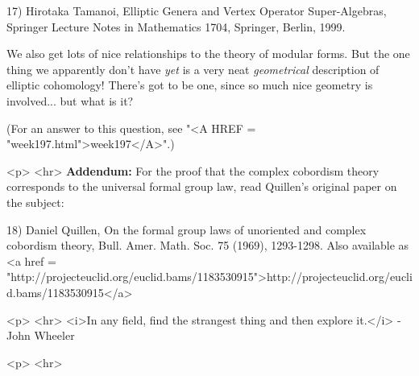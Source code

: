 17) Hirotaka Tamanoi, Elliptic Genera and Vertex Operator Super-Algebras,
Springer Lecture Notes in Mathematics 1704, Springer, Berlin, 1999.

We also get lots of nice relationships to the theory of modular forms.
But the one thing we apparently don't have \emph{yet} is a very neat 
\emph{geometrical} description of elliptic cohomology!  There's got to be 
one, since so much nice geometry is involved... but what is it?


(For an answer to this question, 
see "<A HREF = "week197.html">week197</A>".)

<p> <hr>
\textbf{Addendum:} For the proof that the complex cobordism theory
corresponds to the universal formal group law, read Quillen's original
paper on the subject:

18) Daniel Quillen, On the formal group laws of unoriented and complex 
cobordism theory, Bull. Amer. Math. Soc. 75 (1969), 1293-1298. 
Also available as <a href = "http://projecteuclid.org/euclid.bams/1183530915">http://projecteuclid.org/euclid.bams/1183530915</a>


<p> <hr>
<i>In any field, find the strangest thing and then explore it.</i> - 
John Wheeler

<p> <hr>



